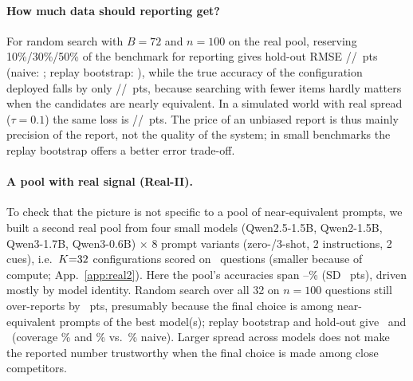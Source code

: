 \paragraph{How much data should reporting get?}
For random search with $B{=}72$ and $n{=}100$ on the real pool, reserving 10\%/30\%/50\% of the benchmark for reporting gives hold-out RMSE \FrRmseTenNHund/\FrRmseThirtyNHund/\FrRmseFiftyNHund\ pts (naive: \FrRmseNaiveNHund; replay bootstrap: \RmseBootRSNHund), while the true accuracy of the configuration deployed falls by only \FrLossTenNHund/\FrLossThirtyNHund/\FrLossFiftyNHund\ pts, because searching with fewer items hardly matters when the candidates are nearly equivalent. In a simulated world with real spread ($\tau{=}0.1$) the same loss is \FrSynLossTenNHund/\FrSynLossThirtyNHund/\FrSynLossFiftyNHund\ pts. The price of an unbiased report is thus mainly precision of the report, not the quality of the system; in small benchmarks the replay bootstrap offers a better error trade-off.
\paragraph{A pool with real signal (Real-II).}
To check that the picture is not specific to a pool of near-equivalent prompts, we built a second real pool from four small models (Qwen2.5-1.5B, Qwen2-1.5B, Qwen3-1.7B, Qwen3-0.6B) $\times$ 8 prompt variants (zero-/3-shot, 2 instructions, 2 cues), i.e.\ $K{=}32$ configurations scored on \RTwoN\ questions (smaller because of compute; App.~\ref{app:real2}). Here the pool's accuracies span \RTwoMin--\RTwoMax\% (SD \RTwoSD\ pts), driven mostly by model identity. Random search over all 32 on $n{=}100$ questions still over-reports by \RTwoNaiveNHund\ pts, presumably because the final choice is among near-equivalent prompts of the best model(s); replay bootstrap and hold-out give \RTwoBootNHund\ and \RTwoHoldNHund\ (coverage \RTwoCovBootNHund\% and \RTwoCovHoldNHund\% vs.\ \RTwoCovNaiveNHund\% naive). Larger spread across models does not make the reported number trustworthy when the final choice is made among close competitors.
